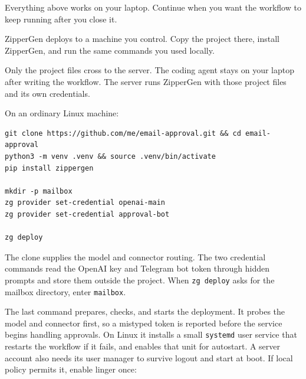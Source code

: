 \documentclass[11pt,a4paper]{article}
\begin{document}
Everything above works on your laptop. Continue when you want the workflow to
keep running after you close it.

ZipperGen deploys to a machine you control. Copy the project there, install
ZipperGen, and run the same commands you used locally.

\begin{center}
\end{center}

Only the project files cross to the server. The coding agent stays on your
laptop after writing the workflow. The server runs ZipperGen with those project
files and its own credentials.

On an ordinary Linux machine:

\begin{lstlisting}[style=shell]
git clone https://github.com/me/email-approval.git && cd email-approval
python3 -m venv .venv && source .venv/bin/activate
pip install zippergen

mkdir -p mailbox
zg provider set-credential openai-main
zg provider set-credential approval-bot

zg deploy
\end{lstlisting}

The clone supplies the model and connector routing. The two credential commands
read the OpenAI key and Telegram bot token through hidden prompts and store them
outside the project. When \texttt{zg deploy} asks for the mailbox directory,
enter \texttt{mailbox}.

The last command prepares, checks, and starts the deployment. It probes the
model and connector first, so a mistyped token is reported before the service
begins handling approvals. On Linux it installs a small \texttt{systemd}
user service that restarts the workflow if it fails, and enables that unit for
autostart. A server account also needs its user manager to survive logout and
start at boot. If local policy permits it, enable linger once:
\end{document}
